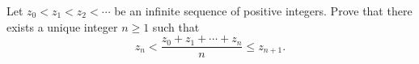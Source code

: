 Let $z_0 < z_1 < z_2 < \cdots$ be an infinite sequence of positive integers. Prove that there exists a unique integer $n \geq 1$ such that
\[
z_n < \frac{z_0 + z_1 + \cdots + z_n}{n} \leq z_{n+1}.
\]
